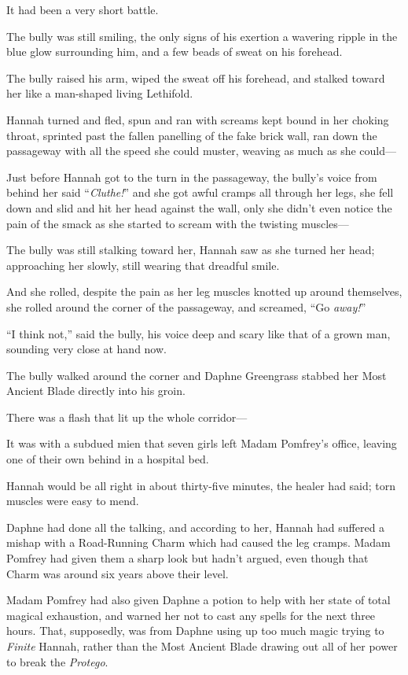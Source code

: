 It had been a very short battle.

The bully was still smiling, the only signs of his exertion a wavering ripple in the blue glow surrounding him, and a few beads of sweat on his forehead.

The bully raised his arm, wiped the sweat off his forehead, and stalked toward her like a man-shaped living Lethifold.

Hannah turned and fled, spun and ran with screams kept bound in her choking throat, sprinted past the fallen panelling of the fake brick wall, ran down the passageway with all the speed she could muster, weaving as much as she could—

Just before Hannah got to the turn in the passageway, the bully’s voice from behind her said “\emph{Cluthe!}” and she got awful cramps all through her legs, she fell down and slid and hit her head against the wall, only she didn’t even notice the pain of the smack as she started to scream with the twisting muscles—

The bully was still stalking toward her, Hannah saw as she turned her head; approaching her slowly, still wearing that dreadful smile.

And she rolled, despite the pain as her leg muscles knotted up around themselves, she rolled around the corner of the passageway, and screamed, “Go \emph{away!}”

“I think not,” said the bully, his voice deep and scary like that of a grown man, sounding very close at hand now.

The bully walked around the corner and Daphne Greengrass stabbed her Most Ancient Blade directly into his groin.

There was a flash that lit up the whole corridor—

\later

It was with a subdued mien that seven girls left Madam Pomfrey’s office, leaving one of their own behind in a hospital bed.

Hannah would be all right in about thirty-five minutes, the healer had said; torn muscles were easy to mend.

Daphne had done all the talking, and according to her, Hannah had suffered a mishap with a Road-Running Charm which had caused the leg cramps. Madam Pomfrey had given them a sharp look but hadn’t argued, even though that Charm was around six years above their level.

Madam Pomfrey had also given Daphne a potion to help with her state of total magical exhaustion, and warned her not to cast any spells for the next three hours. That, supposedly, was from Daphne using up too much magic trying to \emph{Finite} Hannah, rather than the Most Ancient Blade drawing out all of her power to break the \emph{Protego}.

